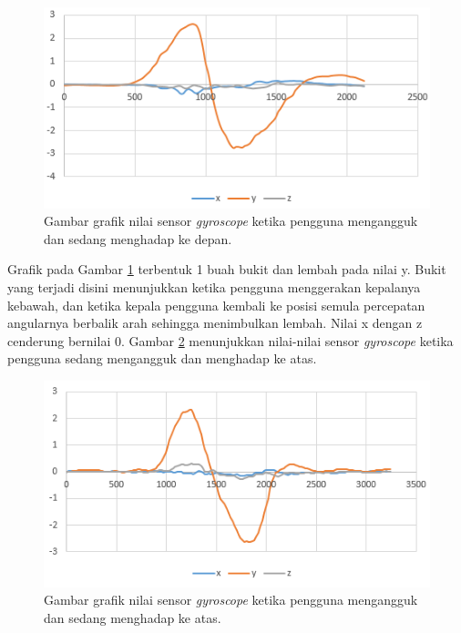 \begin{figure}[htbp]
\centering
\includegraphics[scale=1]{Gambar/grafik-sensor-gyroscope-mengangguk-depan.png}
\caption{Gambar grafik nilai sensor \textit{gyroscope} ketika pengguna mengangguk dan sedang menghadap ke depan.} 
\label{fig:grafik-sensor-gyroscope-mengangguk-depan}
\end{figure}

Grafik pada Gambar \ref{fig:grafik-sensor-gyroscope-mengangguk-depan} terbentuk 1 buah bukit dan lembah pada nilai y. Bukit yang terjadi disini menunjukkan ketika pengguna menggerakan kepalanya kebawah, dan ketika kepala pengguna kembali ke posisi semula percepatan angularnya berbalik arah sehingga menimbulkan lembah. Nilai x dengan z cenderung bernilai 0. Gambar \ref{fig:grafik-sensor-gyroscope-mengangguk-atas} menunjukkan nilai-nilai sensor \textit{gyroscope} ketika pengguna sedang mengangguk dan menghadap ke atas.

\begin{figure}[htbp]
\centering
\includegraphics[scale=1]{Gambar/grafik-sensor-gyroscope-mengangguk-atas.png}
\caption{Gambar grafik nilai sensor \textit{gyroscope} ketika pengguna mengangguk dan sedang menghadap ke atas.} 
\label{fig:grafik-sensor-gyroscope-mengangguk-atas}
\end{figure}

